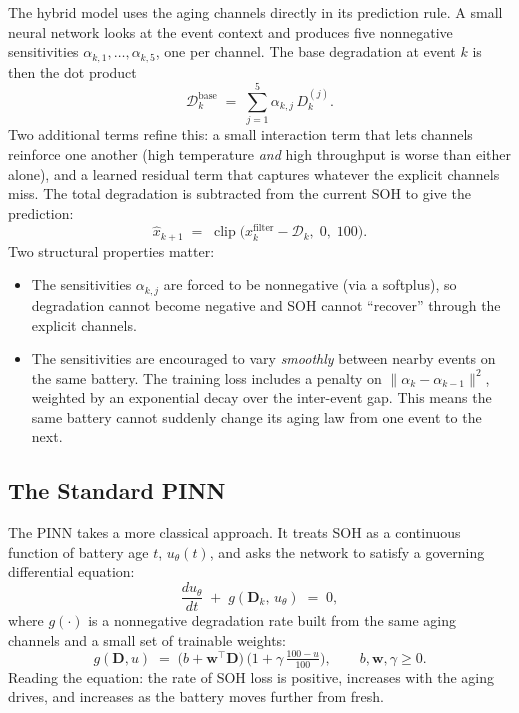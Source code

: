 \documentclass[11pt]{article}
\begin{document}
The hybrid model uses the aging channels directly in its prediction
rule. A small neural network looks at the event context and produces
five nonnegative sensitivities \(\alpha_{k,1}, \dots, \alpha_{k,5}\),
one per channel. The base degradation at event \(k\) is then the
dot product
\begin{equation}
\mathcal{D}^{\mathrm{base}}_k \;=\; \sum_{j=1}^{5} \alpha_{k,j}\, D^{(j)}_k.
\end{equation}
Two additional terms refine this: a small interaction term that lets
channels reinforce one another (high temperature \emph{and} high
throughput is worse than either alone), and a learned residual term
that captures whatever the explicit channels miss. The total
degradation is subtracted from the current SOH to give the prediction:
\begin{equation}
\widehat{x}_{k+1} \;=\; \operatorname{clip}\!\big(x^{\mathrm{filter}}_k - \mathcal{D}_k,\; 0,\; 100\big).
\label{eq:hybrid_pred}
\end{equation}
Two structural properties matter:
\begin{itemize}[leftmargin=*]
    \item The sensitivities \(\alpha_{k,j}\) are forced to be
    nonnegative (via a softplus), so degradation cannot become negative
    and SOH cannot ``recover'' through the explicit channels.
    \item The sensitivities are encouraged to vary \emph{smoothly}
    between nearby events on the same battery. The training loss
    includes a penalty on \(\|\alpha_k - \alpha_{k-1}\|^2\), weighted
    by an exponential decay over the inter-event gap. This means the
    same battery cannot suddenly change its aging law from one event
    to the next.
\end{itemize}

\subsection{The Standard PINN}

The PINN takes a more classical approach. It treats SOH as a continuous
function of battery age \(t\), \(u_\theta(t)\), and asks the network
to satisfy a governing differential equation:
\begin{equation}
\frac{du_\theta}{dt} \;+\; g(\mathbf{D}_k,\, u_\theta) \;=\; 0,
\label{eq:pinn_ode}
\end{equation}
where \(g(\cdot)\) is a nonnegative degradation rate built from the
same aging channels and a small set of trainable weights:
\begin{equation}
g(\mathbf{D}, u) \;=\; \big(b + \mathbf{w}^{\top}\mathbf{D}\big)\,\Big(1 + \gamma\,\tfrac{100-u}{100}\Big),
\qquad b, \mathbf{w}, \gamma \ge 0.
\end{equation}
Reading the equation: the rate of SOH loss is positive, increases with
the aging drives, and increases as the battery moves further from
fresh.
\end{document}
